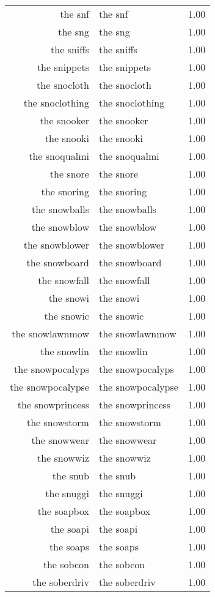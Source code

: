 \begin{table}[ht]
\begin{tabular}{rlr}
  the snf & the snf & 1.00 \\ 
  the sng & the sng & 1.00 \\ 
  the sniffs & the sniffs & 1.00 \\ 
  the snippets & the snippets & 1.00 \\ 
  the snocloth & the snocloth & 1.00 \\ 
  the snoclothing & the snoclothing & 1.00 \\ 
  the snooker & the snooker & 1.00 \\ 
  the snooki & the snooki & 1.00 \\ 
  the snoqualmi & the snoqualmi & 1.00 \\ 
  the snore & the snore & 1.00 \\ 
  the snoring & the snoring & 1.00 \\ 
  the snowballs & the snowballs & 1.00 \\ 
  the snowblow & the snowblow & 1.00 \\ 
  the snowblower & the snowblower & 1.00 \\ 
  the snowboard & the snowboard & 1.00 \\ 
  the snowfall & the snowfall & 1.00 \\ 
  the snowi & the snowi & 1.00 \\ 
  the snowic & the snowic & 1.00 \\ 
  the snowlawnmow & the snowlawnmow & 1.00 \\ 
  the snowlin & the snowlin & 1.00 \\ 
  the snowpocalyps & the snowpocalyps & 1.00 \\ 
  the snowpocalypse & the snowpocalypse & 1.00 \\ 
  the snowprincess & the snowprincess & 1.00 \\ 
  the snowstorm & the snowstorm & 1.00 \\ 
  the snowwear & the snowwear & 1.00 \\ 
  the snowwiz & the snowwiz & 1.00 \\ 
  the snub & the snub & 1.00 \\ 
  the snuggi & the snuggi & 1.00 \\ 
  the soapbox & the soapbox & 1.00 \\ 
  the soapi & the soapi & 1.00 \\ 
  the soaps & the soaps & 1.00 \\ 
  the sobcon & the sobcon & 1.00 \\ 
  the soberdriv & the soberdriv & 1.00 \\ 

\end{tabular}
\end{table}
